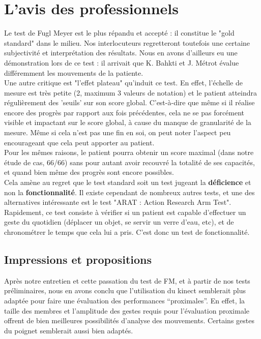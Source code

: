 \documentclass[french,12pt]{report}
\begin{document}
  \section{L'avis des professionnels}
	Le test de Fugl Meyer est le plus répandu et accepté : il constitue le "gold standard" dans le milieu.
	Nos interlocuteurs regretteront toutefois une certaine subjectivité et interprétation des résultats.
	Nous en avons d'ailleurs eu une démonstration lors de ce test : il arrivait que K. Bahkti et J. Métrot 
	évalue différemment les mouvements de la patiente. \\
Une autre critique est "l'effet plateau" qu'induit ce test. En effet, l'échelle de mesure est très petite 
(2, maximum 3 valeurs de notation) et le patient atteindra régulièrement des 'seuils' sur son score global. 
C'est-à-dire que même si il réalise encore des progrès par rapport aux fois précédentes, cela ne se pas forcément 
visible et impactant sur le score global, à cause du manque de granularité de la mesure. Même si cela n'est pas une 
fin en soi, on peut noter l'aspect peu encourageant que cela peut apporter au patient. \\
Pour les mêmes raisons, le patient pourra obtenir un score maximal (dans notre étude de cas, 66/66) sans pour autant
avoir recouvré la totalité de ses capacités, et quand bien même des progrès sont encore possibles. \\
Cela amène au regret que le test standard soit un test jugeant la \textbf{déficience} et non la \textbf{fonctionnalité}. 
Il existe cependant de nombreux autres tests, et une des alternatives intéressante est le test "ARAT : 
Action Research Arm Test". %
Rapidement, ce test consiste à vérifier si un patient est capable d'effectuer un geste du quotidien (déplacer
un objet, se servir un verre d'eau, etc), et de chronométrer le temps que cela lui a pris. C'est donc un test 
de fonctionnalité.
	
	\subsection{Impressions et propositions}
Après notre entretien et cette passation du test de FM, et à partir de nos tests préliminaires, nous en avons 
conclu que l'utilisation du kinect semblerait plus adaptée pour faire une évaluation des performances “proximales”.
En effet, la taille des membres et l'amplitude des gestes requis pour l'évaluation proximale offrent de bien 
meilleures possibilités d'analyse des mouvements. Certains gestes du poignet semblerait aussi bien adaptés.
\end{document}
